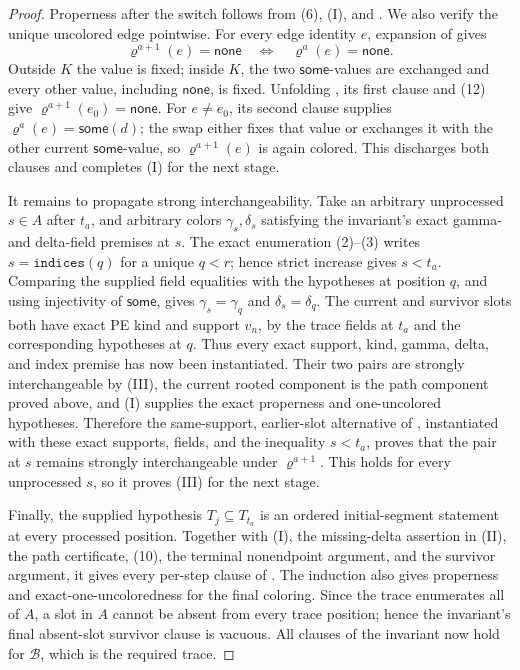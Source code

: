 \begin{proof}
Properness after the switch follows from (6), (I), and
.  We also verify the unique
uncolored edge pointwise.  For every edge identity \(e\), expansion of
 gives
\[
 \varrho^{a+1}(e)=\mathsf{none}
       \quad\Longleftrightarrow\quad
 \varrho^a(e)=\mathsf{none}.                                 \tag{12}
\]
Outside \(K\) the value is fixed; inside \(K\), the two
\(\mathsf{some}\)-values are exchanged and every other value, including
\(\mathsf{none}\), is fixed.  Unfolding
, its first clause and (12) give
\(\varrho^{a+1}(e_0)=\mathsf{none}\).  For \(e\ne e_0\), its second
clause supplies \(\varrho^a(e)=\mathsf{some}(d)\); the swap either fixes
that value or exchanges it with the other current
\(\mathsf{some}\)-value, so \(\varrho^{a+1}(e)\) is again colored.
This discharges both clauses and completes (I) for the next stage.

It remains to propagate strong interchangeability.  Take an arbitrary
unprocessed \(s\in A\) after \(t_a\), and arbitrary colors
\(\gamma_s,\delta_s\) satisfying the invariant's exact gamma- and
delta-field premises at \(s\).  The exact enumeration (2)--(3) writes
\(s=\mathtt{indices}(q)\) for a unique \(q<r\); hence strict increase gives
\(s<t_a\).  Comparing the supplied field equalities with the hypotheses
at position \(q\), and using injectivity of \(\mathsf{some}\), gives
\(\gamma_s=\gamma_q\) and \(\delta_s=\delta_q\).  The current and
survivor slots both have exact PE kind and support \(v_n\), by the
trace fields at \(t_a\) and the corresponding hypotheses at \(q\).
Thus every exact support, kind, gamma, delta, and index premise has now
been instantiated.  Their two pairs are strongly interchangeable by
(III), the current rooted component is the path component proved above,
and (I) supplies the exact properness and one-uncolored hypotheses.
Therefore the same-support, earlier-slot alternative of
, instantiated with these
exact supports, fields, and the inequality \(s<t_a\), proves that the
pair at \(s\) remains strongly interchangeable under
\(\varrho^{a+1}\).  This holds for every unprocessed \(s\), so it proves
(III) for the next stage.

Finally, the supplied hypothesis \(T_j\subseteq T_{t_a}\) is an ordered
initial-segment statement at every processed position.  Together with
(I), the missing-delta assertion in (II), the path certificate, (10),
the terminal nonendpoint argument, and the survivor argument, it gives
every per-step clause of
.  The induction also gives
properness and exact-one-uncoloredness for the final coloring.  Since the
trace enumerates all of \(A\), a slot in \(A\) cannot be absent from every
trace position; hence the invariant's final absent-slot survivor clause is
vacuous.  All clauses of the invariant now hold for \(\mathcal B\), which
is the required trace.
\end{proof}
